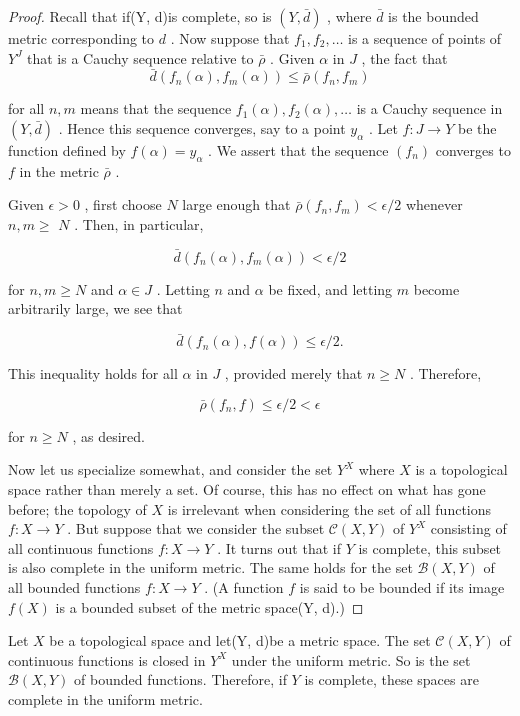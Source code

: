 \begin{proof}Recall that if(Y, d)is complete, so is \(\left( {Y,\bar{d}}\right)\) , where \(\bar{d}\) is the bounded metric corresponding to \(d\) . Now suppose that \({f}_{1},{f}_{2},\ldots\) is a sequence of points of \({Y}^{J}\) that is a Cauchy sequence relative to \(\bar{\rho }\) . Given \(\alpha\) in \(J\) , the fact that
\[
\bar{d}\left( {{f}_{n}\left( \alpha \right) ,{f}_{m}\left( \alpha \right) }\right)  \leq  \bar{\rho }\left( {{f}_{n},{f}_{m}}\right)
\]

for all \(n,m\) means that the sequence \({f}_{1}\left( \alpha \right) ,{f}_{2}\left( \alpha \right) ,\ldots\) is a Cauchy sequence in \(\left( {Y,\bar{d}}\right)\) . Hence this sequence converges, say to a point \({y}_{\alpha }\) . Let \(f : J \rightarrow  Y\) be the function defined by \(f\left( \alpha \right)  = {y}_{\alpha }\) . We assert that the sequence \(\left( {f}_{n}\right)\) converges to \(f\) in the metric \(\bar{\rho }\) .

Given \(\epsilon  > 0\) , first choose \(N\) large enough that \(\bar{\rho }\left( {{f}_{n},{f}_{m}}\right)  < \epsilon /2\) whenever \(n,m \geq\)  \(N\) . Then, in particular,

\[
\bar{d}\left( {{f}_{n}\left( \alpha \right) ,{f}_{m}\left( \alpha \right) }\right)  < \epsilon /2
\]

for \(n,m \geq  N\) and \(\alpha  \in  J\) . Letting \(n\) and \(\alpha\) be fixed, and letting \(m\) become arbitrarily large, we see that

\[
\bar{d}\left( {{f}_{n}\left( \alpha \right) ,f\left( \alpha \right) }\right)  \leq  \epsilon /2.
\]

This inequality holds for all \(\alpha\) in \(J\) , provided merely that \(n \geq  N\) . Therefore,

\[
\bar{\rho }\left( {{f}_{n},f}\right)  \leq  \epsilon /2 < \epsilon
\]

for \(n \geq  N\) , as desired.

Now let us specialize somewhat, and consider the set \({Y}^{X}\) where \(X\) is a topological space rather than merely a set. Of course, this has no effect on what has gone before; the topology of \(X\) is irrelevant when considering the set of all functions \(f : X \rightarrow  Y\) . But suppose that we consider the subset \(\mathcal{C}\left( {X,Y}\right)\) of \({Y}^{X}\) consisting of all continuous functions \(f : X \rightarrow  Y\) . It turns out that if \(Y\) is complete, this subset is also complete in the uniform metric. The same holds for the set \(\mathcal{B}\left( {X,Y}\right)\) of all bounded functions \(f : X \rightarrow  Y\) . (A function \(f\) is said to be bounded if its image \(f\left( X\right)\) is a bounded subset of the metric space(Y, d).)
\end{proof}
\begin{theorem} Let \(X\) be a topological space and let(Y, d)be a metric space. The set \(\mathcal{C}\left( {X,Y}\right)\) of continuous functions is closed in \({Y}^{X}\) under the uniform metric. So is the set \(\mathcal{B}\left( {X,Y}\right)\) of bounded functions. Therefore, if \(Y\) is complete, these spaces are complete in the uniform metric.
\end{theorem}

